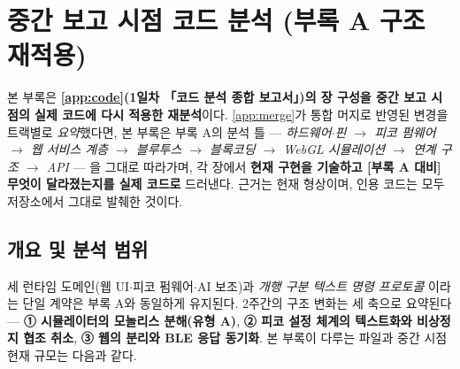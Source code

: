 \chapter{중간 보고 시점 코드 분석 (부록 A 구조 재적용)}
\label{app:midcode}

본 부록은 \textbf{\ref{app:code}(1일차 「코드 분석 종합 보고서」)의 장 구성을 중간 보고
시점의 실제 코드에 다시 적용한 재분석}이다. \ref{app:merge}가 통합 머지로 반영된
변경을 트랙별로 \emph{요약}했다면, 본 부록은 부록 A의 분석 틀 --- \emph{하드웨어$\cdot$핀 $\to$
피코 펌웨어 $\to$ 웹 서비스 계층 $\to$ 블루투스 $\to$ 블록코딩 $\to$ WebGL 시뮬레이션 $\to$
연계 구조 $\to$ API} --- 을 그대로 따라가며, 각 장에서 \textbf{현재 구현을 기술하고
\textnormal{[부록 A 대비]} 무엇이 달라졌는지를 실제 코드로} 드러낸다. 근거는 현재 
형상이며, 인용 코드는 모두 저장소에서 그대로 발췌한 것이다.

\section{개요 및 분석 범위}
세 런타임 도메인(웹 UI$\cdot$피코 펌웨어$\cdot$AI 보조)과 \emph{개행 구분 텍스트 명령 프로토콜}
이라는 단일 계약은 부록 A와 동일하게 유지된다. 2주간의 구조 변화는 세 축으로 요약된다 ---
\textbf{① 시뮬레이터의 모놀리스 분해(유형 A)}, \textbf{② 피코 설정 체계의 텍스트화와 비상정지
협조 취소}, \textbf{③ 웹의  분리와 BLE 응답 동기화}. 본 부록이 다루는 파일과
중간 시점 현재 규모는 다음과 같다.

